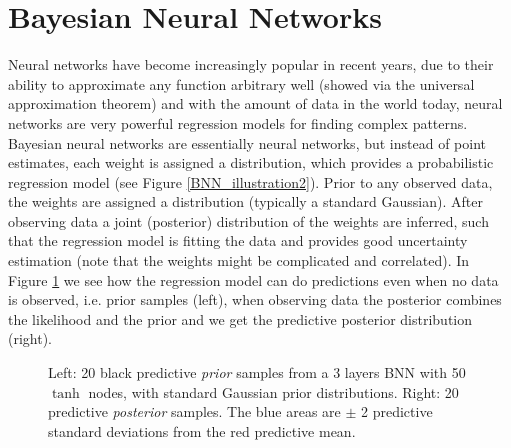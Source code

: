 \section{Bayesian Neural Networks}\label{BNN} 

Neural networks have become increasingly popular in recent years, due to their ability to
approximate any function arbitrary well (showed via the universal approximation theorem) and with
the amount of data in the world today, neural networks are very powerful regression models for
finding complex patterns. Bayesian neural networks are essentially neural networks, but instead of
point estimates, each weight is assigned a distribution, which provides a probabilistic regression
model (see Figure \ref{BNN_illustration2}). Prior to any observed data, the weights are assigned a
distribution (typically a standard Gaussian). After observing data a joint (posterior) distribution
of the weights are inferred, such that the regression model is fitting the data and provides good
uncertainty estimation (note that the weights might be complicated and correlated). In Figure
\ref{BNN_prior_posterior} we see how the regression model can do predictions even when no data is
observed, i.e. prior samples (left), when observing data the posterior combines the likelihood and
the prior and we get the predictive posterior distribution (right). 
\begin{figure}[H]
    \qquad
    \caption{Left: 20 black predictive \textit{prior} samples from a 3 layers BNN with 50 $\tanh$ nodes, with standard Gaussian prior distributions. 
     Right: 20 predictive \textit{posterior} samples. The blue areas are $\pm$ 2 predictive standard
     deviations from the red predictive mean.}%
    \label{BNN_prior_posterior}%
\end{figure}

